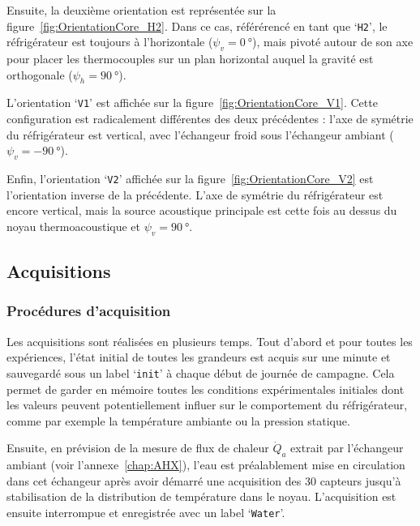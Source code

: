 Ensuite, la deuxième orientation est représentée sur la figure~\ref{fig:OrientationCore_H2}. Dans ce cas, référérencé en tant que `\texttt{H2}', le réfrigérateur est toujours à l'horizontale ($\psi_v=\qty{0}{\degree}$), mais pivoté autour de son axe pour placer les thermocouples sur un plan horizontal auquel la gravité est orthogonale ($\psi_h=\qty{90}{\degree}$).\medskip

L'orientation `\texttt{V1}' est affichée sur la figure~\ref{fig:OrientationCore_V1}. Cette configuration est radicalement différentes des deux précédentes : l'axe de symétrie du réfrigérateur est vertical, avec l'échangeur froid sous l'échangeur ambiant ($\psi_v=\qty{-90}{\degree}$). \smallskip

Enfin, l'orientation `\texttt{V2}' affichée sur la figure~\ref{fig:OrientationCore_V2} est l'orientation inverse de la précédente. L'axe de symétrie du réfrigérateur est encore vertical, mais la source acoustique principale est cette fois au dessus du noyau thermoacoustique et $\psi_v=\qty{+90}{\degree}$.

\subsection{Acquisitions}
\subsubsection{Procédures d'acquisition}
Les acquisitions sont réalisées en plusieurs temps. Tout d'abord et pour toutes les expériences,  l'état initial de toutes les grandeurs est acquis sur une minute et sauvegardé sous un label `\texttt{init}' à chaque début de journée de campagne. Cela permet de garder en mémoire toutes les conditions expérimentales initiales dont les valeurs peuvent potentiellement influer sur le comportement du réfrigérateur, comme par exemple la température ambiante ou la pression statique. \medskip

Ensuite, en prévision de la mesure de flux de chaleur $\dot Q_a$ extrait par l'échangeur ambiant (voir l'annexe~\ref{chap:AHX}), l'eau est préalablement mise en circulation dans cet échangeur après avoir démarré une acquisition des 30 capteurs jusqu'à stabilisation de la distribution de température dans le noyau. L'acquisition est ensuite interrompue et enregistrée avec un label `\texttt{Water}'. \bigskip

